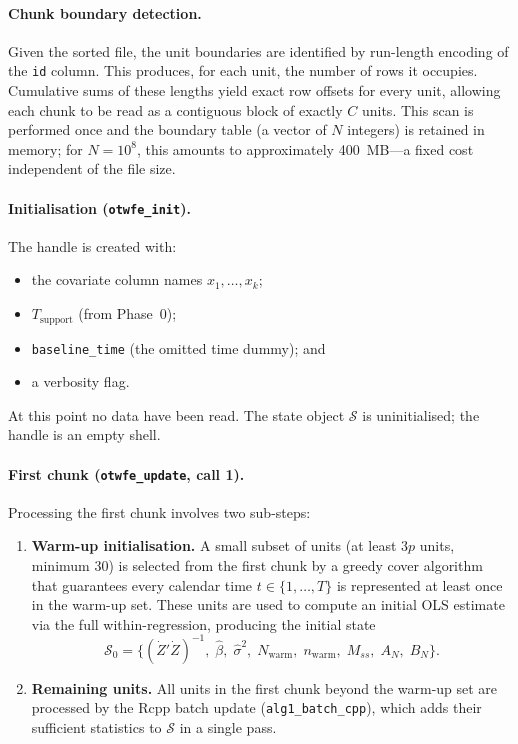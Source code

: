 \documentclass[11pt, a4paper]{article}
\begin{document}
\paragraph{Chunk boundary detection.}
Given the sorted file, the unit boundaries are identified by run-length
encoding of the \texttt{id} column.  This produces, for each unit, the number
of rows it occupies.  Cumulative sums of these lengths yield exact row offsets
for every unit, allowing each chunk to be read as a contiguous block of exactly
$C$ units.  This scan is performed once and the boundary table (a vector of
$N$ integers) is retained in memory; for $N = 10^8$, this amounts to
approximately 400~MB---a fixed cost independent of the file size.

\paragraph{Initialisation (\texttt{otwfe\_init}).}
The handle is created with:
\begin{itemize}
  \item the covariate column names $x_1,\ldots,x_k$;
  \item $T_{\mathrm{support}}$ (from Phase~0);
  \item \texttt{baseline\_time} (the omitted time dummy); and
  \item a verbosity flag.
\end{itemize}
At this point no data have been read.  The state object $\mathcal{S}$ is
uninitialised; the handle is an empty shell.

\paragraph{First chunk (\texttt{otwfe\_update}, call 1).}
Processing the first chunk involves two sub-steps:

\begin{enumerate}
  \item \textbf{Warm-up initialisation.}  A small subset of units (at least
  $3p$ units, minimum 30) is selected from the first chunk by a greedy cover
  algorithm that guarantees every calendar time $t \in \{1,\ldots,T\}$ is
  represented at least once in the warm-up set.  These units are used to
  compute an initial OLS estimate via the full within-regression, producing the
  initial state
  \[
    \mathcal{S}_0 = \bigl\{
      (\dot{Z}'\dot{Z})^{-1},\;
      \hat\beta,\;
      \hat\sigma^2,\;
      N_{\mathrm{warm}},\;
      n_{\mathrm{warm}},\;
      M_{ss},\;
      A_N,\;
      B_N
    \bigr\}.
  \]

  \item \textbf{Remaining units.}  All units in the first chunk beyond the
  warm-up set are processed by the Rcpp batch update (\texttt{alg1\_batch\_cpp}),
  which adds their sufficient statistics to $\mathcal{S}$ in a single pass.
\end{enumerate}
\end{document}
